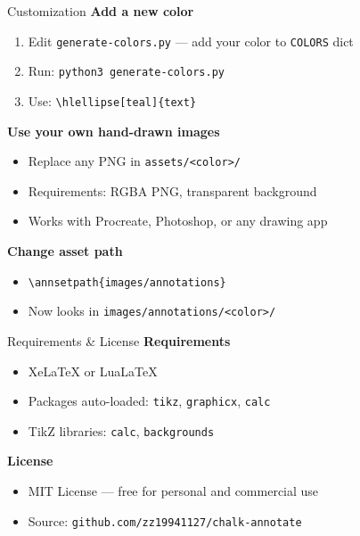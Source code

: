 \documentclass[aspectratio=169, 11pt]{beamer}
\begin{document}
\begin{frame}{Customization}
  \textbf{Add a new color}
  \begin{enumerate}
    \item Edit \texttt{generate-colors.py} — add your color to \texttt{COLORS} dict
    \item Run: \texttt{python3 generate-colors.py}
    \item Use: \texttt{\textbackslash hlellipse[teal]\{text\}}
  \end{enumerate}

  \vspace{0.8em}
  \textbf{Use your own hand-drawn images}
  \begin{itemize}
    \item Replace any PNG in \texttt{assets/<color>/}
    \item Requirements: RGBA PNG, transparent background
    \item Works with Procreate, Photoshop, or any drawing app
  \end{itemize}

  \vspace{0.8em}
  \textbf{Change asset path}
  \begin{itemize}
    \item \texttt{\textbackslash annsetpath\{images/annotations\}}
    \item Now looks in \texttt{images/annotations/<color>/}
  \end{itemize}
\end{frame}

\begin{frame}{Requirements \& License}
  \textbf{Requirements}
  \begin{itemize}
    \item XeLaTeX or LuaLaTeX
    \item Packages auto-loaded: \texttt{tikz}, \texttt{graphicx}, \texttt{calc}
    \item TikZ libraries: \texttt{calc}, \texttt{backgrounds}
  \end{itemize}

  \vspace{1em}
  \textbf{License}
  \begin{itemize}
    \item MIT License — free for personal and commercial use
    \item Source: \texttt{github.com/zz19941127/chalk-annotate}
  \end{itemize}
\end{frame}
\end{document}
